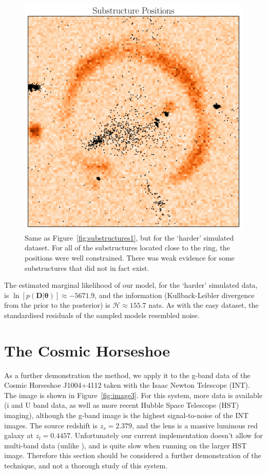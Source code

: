 \documentclass[useAMS,usenatbib]{mn2e}
\newcommand{\revisions}{\color{blue}}
\begin{document}
\begin{figure}
\begin{center}
\includegraphics[scale=0.4]{substructures2.pdf}
\caption{{\revisions
Same as Figure~\ref{fig:substructures1}, but for the `harder' simulated dataset.
For all of the substructures located close to the ring, the positions were well
constrained. There was weak evidence for some substructures that did not in
fact exist.
}
\label{fig:substructures2}}
\end{center}
\end{figure}

{\revisions
The estimated marginal likelihood of our model, for the `harder' simulated data,
is
$\ln\left[p(\boldsymbol{D} | \boldsymbol{\theta})\right] \approx -5671.9$, and
the information (Kullback-Leibler divergence from the prior to the posterior)
is $\mathcal{H} \approx 155.7$ nats. 
As with the easy dataset, the standardised residuals of the sampled models
resembled noise.
}

\section{The Cosmic Horseshoe}
As a further demonstration the method, we apply it to the g-band data
of the Cosmic Horseshoe J1004+4112 \citep{belokurov, 2008MNRAS.388..384D} taken with the Isaac Newton Telescope (INT). The image is shown in Figure~\ref{fig:image3}.
For this system,
more data is available (i and U band data, as well as more recent
Hubble Space Telescope (HST) imaging), although the g-band image is the highest
signal-to-noise of the INT images. The source redshift is $z_s=2.379$, and the
lens is a massive luminous red galaxy at $z_l=0.4457$.
Unfortunately our current implementation
doesn't allow for multi-band data (unlike \citet{2011MNRAS.412.2521B}), and
is quite slow when running on the larger HST image. Therefore this section
should be considered a further demonstration of the technique, and not a
thorough study of this system.
\end{document}
